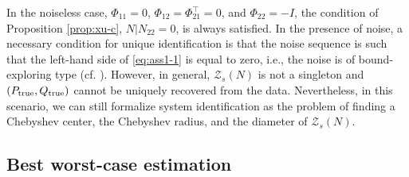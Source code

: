\documentclass[pdflatex,sn-mathphys-num]{sn-jnl}%
\theoremstyle{thmstyleone}
\begin{document}
In the noiseless case, $\Phi_{11}=0$, $\Phi_{12}=\Phi_{21}^\top=0$, and $\Phi_{22}=-I$, the condition of Proposition \ref{prop:xu-c}, $N|N_{22}=0$, is always satisfied. In the presence of noise, a necessary condition for unique identification is that the noise sequence is such that the left-hand side of \eqref{eq:ass1-1} is equal to zero, i.e., the noise is of bound-exploring type (cf. \cite[Ass. 5]{lauricella2020set}). However, in general, $\mathcal{Z}_{s}(N)$ is not a singleton and $(P_{\textup{true}},Q_{\textup{true}})$ cannot be uniquely recovered from the data. Nevertheless, in this scenario, we can still formalize system identification as the problem of finding a Chebyshev center, the Chebyshev radius, and the diameter of $\mathcal{Z}_{s}(N)$. 

\subsection{Best worst-case estimation}
\label{subsec:UniEs}
\end{document}
